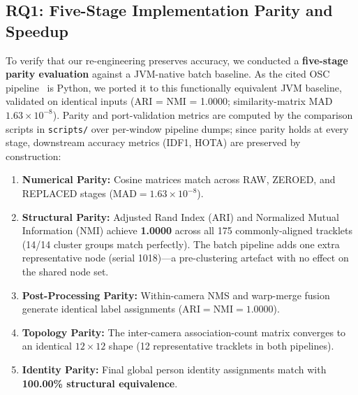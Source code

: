 \documentclass[conference]{IEEEtran}
\begin{document}
\subsection{RQ1: Five-Stage Implementation Parity and Speedup}
To verify that our re-engineering preserves accuracy, we conducted a \textbf{five-stage parity evaluation} against a JVM-native batch baseline. As the cited OSC pipeline~\cite{yoshida2024overlap} is Python, we ported it to this functionally equivalent JVM baseline, validated on identical inputs (ARI = NMI = 1.0000; similarity-matrix MAD $1.63\times10^{-8}$). Parity and port-validation metrics are computed by the comparison scripts in \texttt{scripts/} over per-window pipeline dumps; since parity holds at every stage, downstream accuracy metrics (IDF1, HOTA) are preserved by construction:
\begin{enumerate}
    \item \textbf{Numerical Parity:} Cosine matrices match across RAW, ZEROED, and REPLACED stages ($\text{MAD} = 1.63 \times 10^{-8}$).
    \item \textbf{Structural Parity:} Adjusted Rand Index ($\text{ARI}$) and Normalized Mutual Information ($\text{NMI}$) achieve \textbf{1.0000} across all 175 commonly-aligned tracklets (14/14 cluster groups match perfectly). The batch pipeline adds one extra representative node (serial 1018)---a pre-clustering artefact with no effect on the shared node set.
    \item \textbf{Post-Processing Parity:} Within-camera NMS and warp-merge fusion generate identical label assignments ($\text{ARI} = \text{NMI} = 1.0000$).
    \item \textbf{Topology Parity:} The inter-camera association-count matrix converges to an identical $12\times 12$ shape (12 representative tracklets in both pipelines).
    \item \textbf{Identity Parity:} Final global person identity assignments match with \textbf{100.00\% structural equivalence}.
\end{enumerate}
\end{document}
